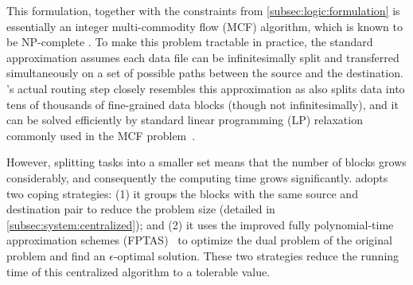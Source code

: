 This formulation, together with the constraints from
\Section\ref{subsec:logic:formulation} is essentially an integer
multi-commodity flow (MCF) algorithm, which is known to be
NP-complete \cite{garg1997primal}. To make this problem tractable in
practice, the standard approximation assumes each data file can be
infinitesimally split and transferred simultaneously on a set of
possible paths between the source and the destination. \name's actual
routing step closely resembles this approximation as \name also
splits data into tens of thousands of fine-grained data blocks
(though not infinitesimally), and it can be solved efficiently by
standard linear programming (LP) relaxation commonly used in the MCF
problem~\cite{garg2007faster,reed2012traffic}.

However, splitting tasks into a smaller set means that the number of blocks grows considerably, and consequently the computing time grows significantly. \name adopts two coping strategies: (1) it groups the blocks with the same source and destination pair to reduce the problem size (detailed in \Section\ref{subsec:system:centralized}); and (2) it uses the improved fully polynomial-time approximation schemes (FPTAS)~\cite{fleischer2000approximating, reed2012traffic} to optimize the dual problem of the original problem and find an $\epsilon$-optimal solution. These two strategies reduce the running time of this centralized algorithm to a tolerable value.





